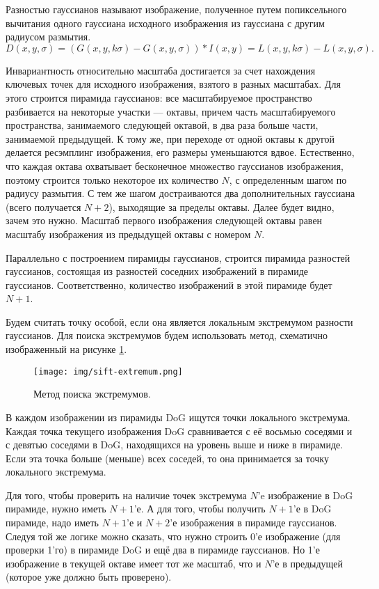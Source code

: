 \documentclass[a4paper,12pt]{report}
\numberwithin{equation}{section}
\begin{document}
Разностью гауссианов называют изображение, полученное путем попиксельного
вычитания одного гауссиана исходного изображения из гауссиана с другим радиусом
размытия.
\[ D(x,y,\sigma) = (G(x,y,k\sigma) - G(x,y,\sigma)) \ast I(x,y) = L(x,y,k\sigma) - L(x,y,\sigma). \]


Инвариантность относительно масштаба достигается за счет нахождения ключевых
точек для исходного изображения, взятого в разных масштабах. Для этого строится
пирамида гауссианов: все масштабируемое пространство разбивается на некоторые
участки — октавы, причем часть масштабируемого пространства, занимаемого
следующей октавой, в два раза больше части, занимаемой предыдущей. К тому же,
при переходе от одной октавы к другой делается ресэмплинг изображения, его
размеры уменьшаются вдвое. Естественно, что каждая октава охватывает бесконечное
множество гауссианов изображения, поэтому строится только некоторое их
количество $N$, с определенным шагом по радиусу размытия. С тем же шагом
достраиваются два дополнительных гауссиана (всего получается $N+2$), выходящие
за пределы октавы. Далее будет видно, зачем это нужно. Масштаб первого
изображения следующей октавы равен масштабу изображения из предыдущей октавы с
номером $N$.


Параллельно с построением пирамиды гауссианов, строится пирамида разностей
гауссианов, состоящая из разностей соседних изображений в пирамиде
гауссианов. Соответственно, количество изображений в этой пирамиде будет $N+1$.


Будем считать точку особой, если она является локальным экстремумом разности
гауссианов. Для поиска экстремумов будем использовать метод, схематично
изображенный на рисунке \ref{fig:sift-extr}.

\begin{figure}[h!]
  \centering
  \texttt{[image: img/sift-extremum.png]}
  \caption{Метод поиска экстремумов.}
  \label{fig:sift-extr} 
\end{figure}

В каждом изображении из пирамиды DoG ищутся точки локального экстремума. Каждая
точка текущего изображения DoG сравнивается с её восьмью соседями и с девятью
соседями в DoG, находящихся на уровень выше и ниже в пирамиде. Если эта точка
больше (меньше) всех соседей, то она принимается за точку локального экстремума.


Для того, чтобы проверить на наличие точек экстремума $N$'e изображение в DoG
пирамиде, нужно иметь $N+1$'е. А для того, чтобы получить $N+1$'е в DoG
пирамиде, надо иметь $N+1$'е и $N+2$'е изображения в пирамиде гауссианов. Следуя
той же логике можно сказать, что нужно строить 0'е изображение (для проверки
1'го) в пирамиде DoG и ещё два в пирамиде гауссианов. Но 1'е изображение в
текущей октаве имеет тот же масштаб, что и $N$'е в предыдущей (которое уже
должно быть проверено).
\end{document}
